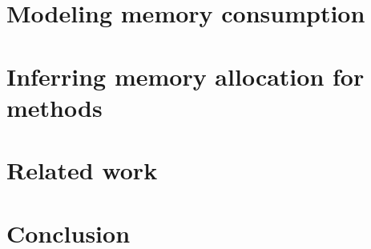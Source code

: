 \documentclass{llncs}
\begin{document}
\section{Modeling memory consumption}\label{sec:verif}


\section{Inferring memory allocation for methods}\label{sec:infer}


\section{Related work}\label{sec:rel}


\section{Conclusion}\label{sec:conc}




%

\end{document}
